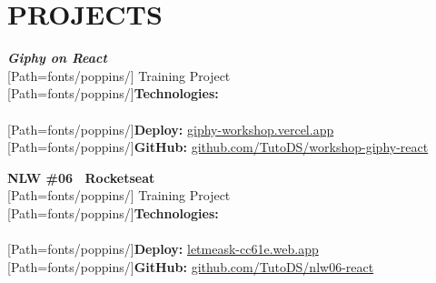 {\color{primary}\section*{\MakeUppercase{Projects}}}

\begin{minipage}{.5\textwidth}
\textbf{\textit{Giphy on React}}\\[3pt]
{
	\scriptsize
	[Path=fonts/poppins/]
	Training Project\\[2pt]

	{[Path=fonts/poppins/]\textbf{Technologies:}}\\
	  \\[2pt]

	{[Path=fonts/poppins/]\textbf{Deploy:}} \href{https://giphy-workshop.vercel.app}{giphy-workshop.vercel.app}\\
	{[Path=fonts/poppins/]\textbf{GitHub:}} \href{https://github.com/TutoDS/workshop-giphy-react}{github.com/TutoDS/workshop-giphy-react}
}
\end{minipage}
\begin{minipage}{.5\textwidth}
	\textbf{NLW \#06 \textemdash~Rocketseat}\\[3pt]
	{
		\scriptsize
		[Path=fonts/poppins/]
		Training Project\\[2pt]

		{[Path=fonts/poppins/]\textbf{Technologies:}}\\
		  \\[2pt]

		{[Path=fonts/poppins/]\textbf{Deploy:}} \href{https://letmeask-cc61e.web.app/}{letmeask-cc61e.web.app}\\
		{[Path=fonts/poppins/]\textbf{GitHub:}} \href{https://github.com/TutoDS/nlw06-react}{github.com/TutoDS/nlw06-react}
	}
\end{minipage}

\vspace{10pt}

